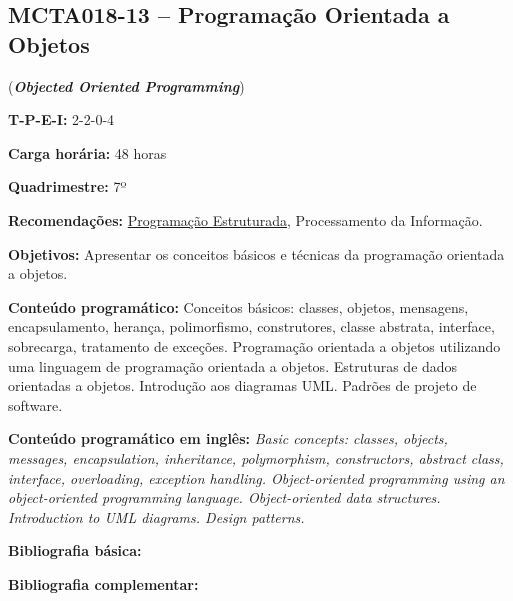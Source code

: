 \documentclass[class=article, crop=false]{standalone}
\begin{document}
\subsection*{MCTA018-13 -- Programação Orientada a Objetos}
\label{disc:poo}

(\textbf{\textit{Objected Oriented Programming}})

\begin{center}
    \begin{minipage}{0.85\textwidth}
        \textbf{T-P-E-I:} 2-2-0-4
    
        \textbf{Carga horária:} 48 horas
        
        \textbf{Quadrimestre:} 7º
        
        \textbf{Recomendações:}
        \hyperref[disc:pe]{Programação Estruturada},
        Processamento da Informação.
    \end{minipage}
\end{center}

\textbf{Objetivos:}
Apresentar os conceitos básicos e técnicas da programação orientada a objetos.

\textbf{Conteúdo programático:}
Conceitos básicos: classes, objetos, mensagens, encapsulamento, herança,
polimorfismo, construtores, classe abstrata, interface, sobrecarga, tratamento
de exceções. 
Programação orientada a objetos utilizando uma linguagem de programação
orientada a objetos. 
Estruturas de dados orientadas a objetos. 
Introdução aos diagramas UML. 
Padrões de projeto de software.

\textbf{Conteúdo programático em inglês:}
\textit{Basic concepts: classes, objects, messages, encapsulation, inheritance,
polymorphism, constructors, abstract class, interface, overloading, exception handling.
Object-oriented programming using an object-oriented programming language.
Object-oriented data structures.
Introduction to UML diagrams.
Design patterns.}

\newrefsection
\textbf{Bibliografia básica:}
\nocite{2005-booch, 2007-larman, 2000-gamma}
\printbibliography

\newrefsection
\textbf{Bibliografia complementar:}
\nocite{2016-meyers, 2015-ramalho, 2010-silva, 2006-flanagan, 2009-guedes}
\printbibliography
\end{document}
